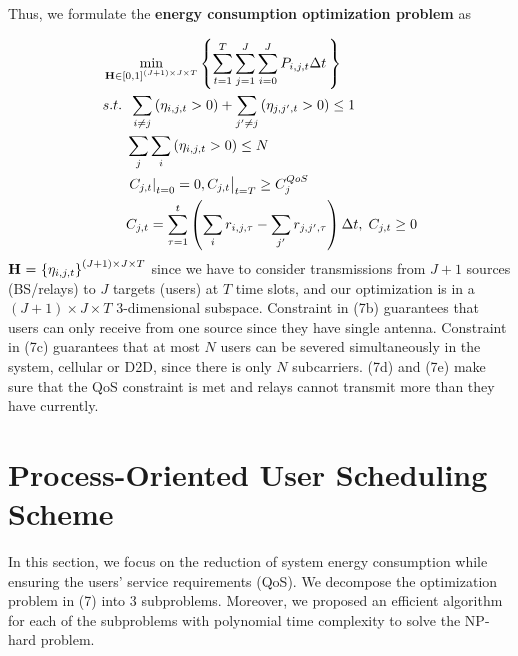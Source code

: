 \documentclass{ieeeaccess}
\begin{document}
Thus, we formulate the \textbf{energy consumption optimization problem} as

\begin{subequations}
\begin{align}
& \mathop {\min }\limits_{{\mathbf{{\rm H}}} \in {{\left[ {0,1} \right]}^{\left( {J + 1} \right) \times J \times T}}} \left\{ {\sum\limits_{t = 1}^T {\sum\limits_{j = 1}^J {\sum\limits_{i = 0}^J {{P_{i,j,t}}\Delta t} \,} } } \right\} \\
& {s.t.} \;\; \sum\limits_{i \ne j} {\left( {{\eta _{i,j,t}} > 0} \right)}  + \sum\limits_{j' \ne j} {\left( {{\eta _{j,j',t}} > 0} \right) \le {\text{1}}} \\
& \;\;\;\;\;\; \sum\limits_j {\sum\limits_i {\left( {{\eta _{i,j,t}} > 0} \right)} }  \le N \\
& \;\;\;\;\;\; {\left. {{{\left. {{C_{j,t}}} \right|}_{t = 0}} = 0, {C_{j,t}}} \right|_{t = T}} \ge C_j^{QoS} \\
& \;\;\;\;\;\; {C_{j,t}} = \sum\limits_{\tau  = 1}^t {\left( {\sum\limits_i {{r_{i,j,\tau }}}  - \sum\limits_{j'} {{r_{j,j',\tau }}} } \right)\Delta t} ,\; {C_{j,t}} \ge 0
\end{align}
\end{subequations}
${\mathbf{{\rm H}}}{\text{ = }}{\left\{ {{\eta _{i,j,t}}} \right\}^{\left( {J + 1} \right) \times J \times T}}$ since we have to consider transmissions from ${J + 1}$ sources (BS/relays) to $J$ targets (users) at $T$ time slots, and our optimization is in a $\left( {J + 1} \right) \times J \times T$ 3-dimensional subspace. Constraint in (7b) guarantees that users can only receive from one source since they have single antenna. Constraint in (7c) guarantees that at most $N$ users can be severed simultaneously in the system, cellular or D2D, since there is only $N$ subcarriers. (7d) and (7e) make sure that the QoS constraint is met and relays cannot transmit more than they have currently.


\section{Process-Oriented User Scheduling Scheme}
In this section, we focus on the reduction of system energy consumption while ensuring the users' service requirements (QoS). We decompose the optimization problem in (7) into 3 subproblems. Moreover, we proposed an efficient algorithm for each of the subproblems with polynomial time complexity to solve the NP-hard problem.

\end{document}
